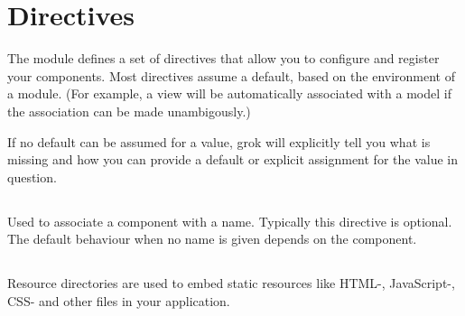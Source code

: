 \chapter{Directives}

The  module defines a set of directives that allow you to
configure and register your components. Most directives assume a default, based
on the environment of a module. (For example, a view will be automatically
associated with a model if the association can be made unambigously.) 

If no default can be assumed for a value, grok will explicitly tell you what is
missing and how you can provide a default or explicit assignment for the value
in question.

    \section{}

    \section{}

    \section{}

    Used to associate a component with a name. Typically this directive is
    optional. The default behaviour when no name is given depends on the
    component.

    \section{}

    \section{}

    \section{}

Resource directories are used to embed static resources like HTML-,
JavaScript-, CSS- and other files in your application. 

